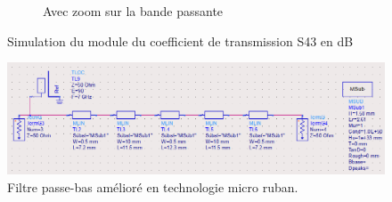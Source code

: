 \documentclass[french]{article}
\begin{document}
\begin{figure}[H]
\begin{subfigure}[b]{0.49\textwidth}
		\caption{Avec zoom sur la bande passante}
		\label{fig:simu_zoom_passe_bas_distribue}
	\end{subfigure}
	\caption{Simulation du module du coefficient de transmission S43 en dB}
\end{figure}


\begin{figure}[H]
	\centering
	\includegraphics[width=15cm]{photo/passe_bas_vic/schema_distribue_ameliore_passe_bas_ads.png}
	\caption{Filtre passe-bas amélioré en technologie micro ruban.}
	\label{fig:schema_distribue_ameliore_passe_bas_ads}
\end{figure}
\end{document}

